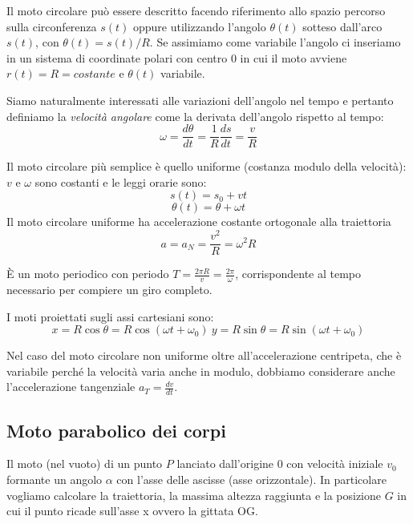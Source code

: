 \documentclass[class=book, crop=false, oneside, 12pt]{standalone}
\begin{document}
Il moto circolare può essere descritto facendo riferimento allo spazio percorso sulla circonferenza \(s(t)\) oppure 
utilizzando l'angolo \(\theta (t)\) sotteso dall'arco \(s(t)\), con \(\theta(t) = s(t)/R\).
Se assimiamo come variabile l'angolo ci inseriamo in un sistema di coordinate polari con centro \(0\) in cui il moto avviene \(r(t) = R = costante\) e \(\theta(t)\) variabile.

Siamo naturalmente interessati alle variazioni dell'angolo nel tempo e pertanto definiamo la \emph{velocità angolare} come la derivata dell'angolo rispetto al tempo:
\begin{equation}
  \omega = \frac{d \theta}{dt} = \frac{1}{R} \frac {ds} {dt} = \frac{v}{R}
\end{equation}

Il moto circolare più semplice è quello uniforme (costanza modulo della velocità): \(v\) e \(\omega\) sono costanti e le leggi orarie sono:
\begin{equation}
  s(t) = s_0 + vt
\end{equation}
\begin{equation}
  \theta(t) = \theta + \omega t
\end{equation}
Il moto circolare uniforme ha accelerazione costante ortogonale alla traiettoria
\begin{equation}
  a = a_N = \frac{v^2}{R} = \omega^2 R
\end{equation}

È un moto periodico con periodo \(T = \frac{2 \pi R}{v} = \frac{2 \pi}{\omega}\), corrispondente al tempo necessario per compiere un giro completo.

I moti proiettati sugli assi cartesiani sono:
\begin{equation}
  x = R \cos \theta = R \cos (\omega t + \omega_0) \
  y = R \sin \theta = R \sin (\omega t + \omega_0)
\end{equation}

Nel caso del moto circolare non uniforme oltre all'accelerazione centripeta, che è variabile perché la velocità varia anche in modulo, dobbiamo considerare anche l'accelerazione tangenziale \(a_T = \frac{dv}{dt} \).

\subsection{Moto parabolico dei corpi}

Il moto (nel vuoto) di un punto \(P\) lanciato dall'origine \(0\) con velocità iniziale \(v_0\) formante un angolo \(\alpha\) con l'asse delle ascisse (asse orizzontale).
In particolare vogliamo calcolare la traiettoria, la massima altezza raggiunta e la posizione \(G\) in cui il punto ricade sull'asse x ovvero la gittata OG.
\end{document}
